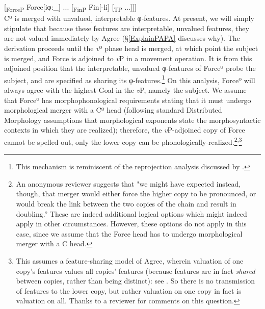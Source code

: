 \documentclass[output=paper
,modfonts
,nonflat
]{langsci/langscibook}
\begin{document}
\ea 
{[}\textsubscript{ForceP} Force[iφ:\_] ... [\textsubscript{FinP} Fin[-li] [\textsubscript{TP} ...]]]\\
\z
\noindent Cº is merged with unvalued, interpretable φ-features. At present, we will simply stipulate that because these features are interpretable, unvalued features, they are not valued immediately by Agree (\S \ref{ExplainPAPA} discusses why). The derivation proceeds until the \textit{v}º phase head is merged, at which point the subject is merged, and Force is adjoined to \textit{v}P in a movement operation. It is from this adjoined position that the interpretable, unvalued φ-features of Forceº probe the subject, and are specified as sharing its φ-features.\footnote{This mechanism is reminiscent of the reprojection analysis discussed by .} On this analysis, Forceº will always agree with the highest Goal in the \textit{v}P, namely the subject. We assume that Forceº has  morphophonological requirements stating that it must undergo morphological merger with a Cº head (following standard Distributed Morphology assumptions that morphological exponents state the morphosyntactic contexts in which they are realized); therefore, the \textit{v}P-adjoined copy of Force cannot be spelled out, only the lower copy can be phonologically-realized.\footnote{An anonymous reviewer suggests that "we might have expected instead, though, that merger would either force the higher copy to be pronounced, or would break the link between the two copies of the chain and result in doubling.” These are indeed additional logical options which might indeed apply in other circumstances. However,  these options do not apply in this case, since we assume that the Force head has to undergo morphological merger with a C head.}\textsuperscript{\textrm{,}}\footnote{This assumes a feature-sharing model of Agree, wherein valuation of one copy's features values all copies' features (because features are in fact \textit{shared} between copies, rather than being distinct): see \citet{FramptonGutmann:2000,Rooryck:2011,Pesetsky:2007}. So there is no transmission of features to the lower copy, but rather valuation on one copy in fact is valuation on all. Thanks to a reviewer for comments on this question.}

\ea \label{upwardagreelubukusu}
\end{document}
